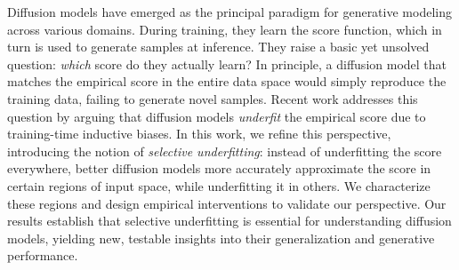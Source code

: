 Diffusion models have emerged as the principal paradigm for generative modeling across various domains. During training, they learn the score function, which in turn is used to generate samples at inference. They raise a basic yet unsolved question: \emph{which} score do they actually learn? In principle, a diffusion model that matches the empirical score in the entire data space would simply reproduce the training data, failing to generate novel samples. Recent work addresses this question by arguing that diffusion models \emph{underfit} the empirical score due to training-time inductive biases.
%
In this work, we refine this perspective, introducing the notion of \emph{selective underfitting}: instead of underfitting the score everywhere, better diffusion models more accurately approximate the score in certain regions of input space, while underfitting it in others.
%
We characterize these regions and design empirical interventions to validate our perspective. Our results establish that selective underfitting is essential for understanding diffusion models, yielding new, testable insights into their generalization and generative performance.
\vspace{-0.1in}